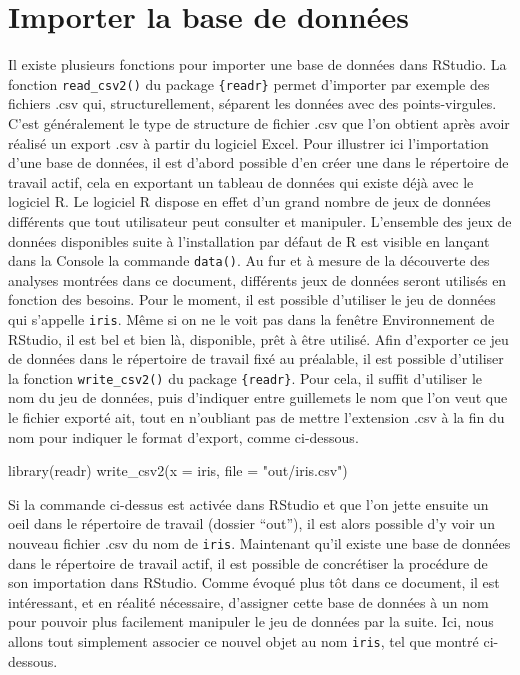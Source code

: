 \documentclass[
  letterpaper,
]{book}
\newenvironment{Shaded}{\begin{snugshade}}{\end{snugshade}}
\newcommand{\AttributeTok}[1]{\textcolor[rgb]{0.40,0.45,0.13}{#1}}
\newcommand{\FunctionTok}[1]{\textcolor[rgb]{0.28,0.35,0.67}{#1}}
\newcommand{\NormalTok}[1]{\textcolor[rgb]{0.00,0.23,0.31}{#1}}
\newcommand{\StringTok}[1]{\textcolor[rgb]{0.13,0.47,0.30}{#1}}
\begin{document}
\section{Importer la base de
données}\label{importer-la-base-de-donnuxe9es}

Il existe plusieurs fonctions pour importer une base de données dans
RStudio. La fonction \texttt{read\_csv2()} du package \texttt{\{readr\}}
permet d'importer par exemple des fichiers .csv qui, structurellement,
séparent les données avec des points-virgules. C'est généralement le
type de structure de fichier .csv que l'on obtient après avoir réalisé
un export .csv à partir du logiciel Excel. Pour illustrer ici
l'importation d'une base de données, il est d'abord possible d'en créer
une dans le répertoire de travail actif, cela en exportant un tableau de
données qui existe déjà avec le logiciel R. Le logiciel R dispose en
effet d'un grand nombre de jeux de données différents que tout
utilisateur peut consulter et manipuler. L'ensemble des jeux de données
disponibles suite à l'installation par défaut de R est visible en
lançant dans la Console la commande \texttt{data()}. Au fur et à mesure
de la découverte des analyses montrées dans ce document, différents jeux
de données seront utilisés en fonction des besoins. Pour le moment, il
est possible d'utiliser le jeu de données qui s'appelle \texttt{iris}.
Même si on ne le voit pas dans la fenêtre Environnement de RStudio, il
est bel et bien là, disponible, prêt à être utilisé. Afin d'exporter ce
jeu de données dans le répertoire de travail fixé au préalable, il est
possible d'utiliser la fonction \texttt{write\_csv2()} du package
\texttt{\{readr\}}. Pour cela, il suffit d'utiliser le nom du jeu de
données, puis d'indiquer entre guillemets le nom que l'on veut que le
fichier exporté ait, tout en n'oubliant pas de mettre l'extension .csv à
la fin du nom pour indiquer le format d'export, comme ci-dessous.

\begin{Shaded}
\begin{Highlighting}[]
\FunctionTok{library}\NormalTok{(readr)}
\FunctionTok{write\_csv2}\NormalTok{(}\AttributeTok{x =}\NormalTok{ iris, }\AttributeTok{file =} \StringTok{"out/iris.csv"}\NormalTok{)}
\end{Highlighting}
\end{Shaded}

Si la commande ci-dessus est activée dans RStudio et que l'on jette
ensuite un oeil dans le répertoire de travail (dossier ``out''), il est
alors possible d'y voir un nouveau fichier .csv du nom de \texttt{iris}.
Maintenant qu'il existe une base de données dans le répertoire de
travail actif, il est possible de concrétiser la procédure de son
importation dans RStudio. Comme évoqué plus tôt dans ce document, il est
intéressant, et en réalité nécessaire, d'assigner cette base de données
à un nom pour pouvoir plus facilement manipuler le jeu de données par la
suite. Ici, nous allons tout simplement associer ce nouvel objet au nom
\texttt{iris}, tel que montré ci-dessous.
\end{document}
